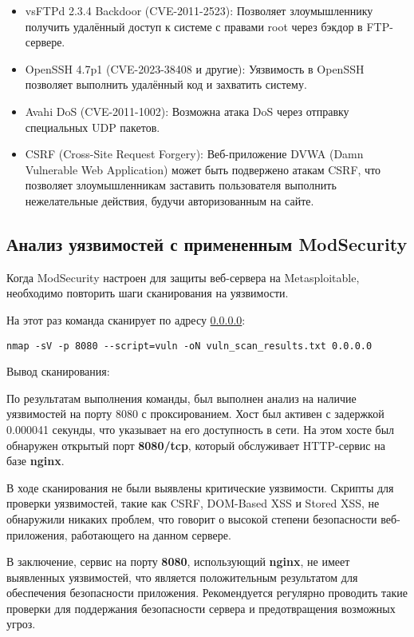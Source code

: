 \begin{itemize}
	\item vsFTPd 2.3.4 Backdoor (CVE-2011-2523):
		Позволяет злоумышленнику получить удалённый доступ
		к системе с правами root через бэкдор в FTP-сервере.
	\item OpenSSH 4.7p1 (CVE-2023-38408 и другие):
		Уязвимость в OpenSSH позволяет выполнить удалённый код
		и захватить систему.
	\item Avahi DoS (CVE-2011-1002):
		Возможна атака DoS через отправку специальных UDP пакетов.
	\item CSRF (Cross-Site Request Forgery):
		Веб-приложение DVWA (Damn Vulnerable Web Application)
		может быть подвержено атакам CSRF,
		что позволяет злоумышленникам заставить
		пользователя выполнить нежелательные действия,
		будучи авторизованным на сайте.
\end{itemize}

\subsection{Анализ уязвимостей с примененным ModSecurity}

Когда ModSecurity настроен для защиты веб-сервера на Metasploitable,
необходимо повторить шаги сканирования на уязвимости.

На этот раз команда сканирует по адресу \url{0.0.0.0}:

\begin{verbatim}
nmap -sV -p 8080 --script=vuln -oN vuln_scan_results.txt 0.0.0.0
\end{verbatim}

Вывод сканирования:



По результатам выполнения команды,
был выполнен анализ на наличие уязвимостей на порту 8080 с проксированием.
Хост был активен с задержкой 0.000041 секунды,
что указывает на его доступность в сети.
На этом хосте был обнаружен открытый порт \textbf{8080/tcp},
который обслуживает HTTP-сервис на базе \textbf{nginx}.\par
В ходе сканирования не были выявлены критические уязвимости.
Скрипты для проверки уязвимостей,
такие как CSRF, DOM-Based XSS и Stored XSS, не обнаружили никаких проблем,
что говорит о высокой степени безопасности веб-приложения,
работающего на данном сервере. \par
В заключение, сервис на порту \textbf{8080}, использующий \textbf{nginx},
не имеет выявленных уязвимостей,
что является положительным результатом для обеспечения безопасности приложения.
Рекомендуется регулярно проводить такие проверки
для поддержания безопасности сервера и предотвращения возможных угроз.

